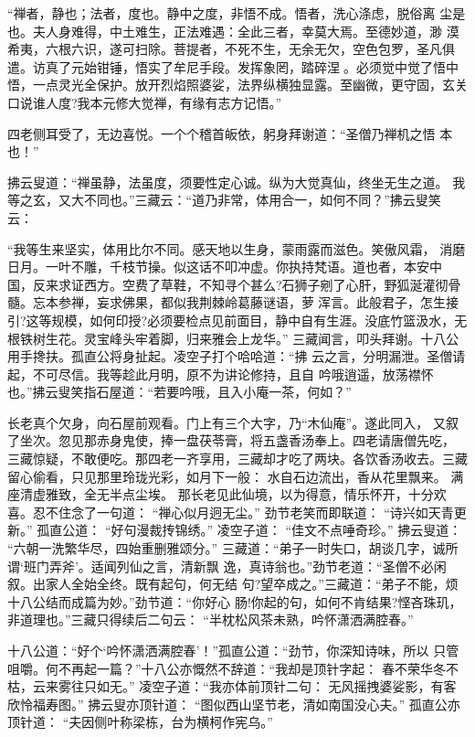 “禅者，静也；法者，度也。静中之度，非悟不成。悟者，洗心涤虑，脱俗离
尘是也。夫人身难得，中土难生，正法难遇：全此三者，幸莫大焉。至德妙道，渺
漠希夷，六根六识，遂可扫除。菩提者，不死不生，无余无欠，空色包罗，圣凡俱
遣。访真了元始钳锤，悟实了牟尼手段。发挥象罔，踏碎涅。必须觉中觉了悟中
悟，一点灵光全保护。放开烈焰照婆娑，法界纵横独显露。至幽微，更守固，玄关
口说谁人度?我本元修大觉禅，有缘有志方记悟。”

四老侧耳受了，无边喜悦。一个个稽首皈依，躬身拜谢道：“圣僧乃禅机之悟
本也！”

拂云叟道：“禅虽静，法虽度，须要性定心诚。纵为大觉真仙，终坐无生之道。
我等之玄，又大不同也。”三藏云：“道乃非常，体用合一，如何不同？”拂云叟笑
云：

“我等生来坚实，体用比尔不同。感天地以生身，蒙雨露而滋色。笑傲风霜，
消磨日月。一叶不雕，千枝节操。似这话不叩冲虚。你执持梵语。道也者，本安中
国，反来求证西方。空费了草鞋，不知寻个甚么?石狮子剜了心肝，野狐涎灌彻骨
髓。忘本参禅，妄求佛果，都似我荆棘岭葛藤谜语，萝浑言。此般君子，怎生接
引?这等规模，如何印授?必须要检点见前面目，静中自有生涯。没底竹篮汲水，无
根铁树生花。灵宝峰头牢着脚，归来雅会上龙华。”
三藏闻言，叩头拜谢。十八公用手搀扶。孤直公将身扯起。凌空子打个哈哈道：“拂
云之言，分明漏泄。圣僧请起，不可尽信。我等趁此月明，原不为讲论修持，且自
吟哦逍遥，放荡襟怀也。”拂云叟笑指石屋道：“若要吟哦，且入小庵一茶，何如？”

长老真个欠身，向石屋前观看。门上有三个大字，乃“木仙庵”。遂此同入，
又叙了坐次。忽见那赤身鬼使，捧一盘茯苓膏，将五盏香汤奉上。四老请唐僧先吃，
三藏惊疑，不敢便吃。那四老一齐享用，三藏却才吃了两块。各饮香汤收去。三藏
留心偷看，只见那里玲珑光彩，如月下一般：
水自石边流出，香从花里飘来。
满座清虚雅致，全无半点尘埃。
那长老见此仙境，以为得意，情乐怀开，十分欢喜。忍不住念了一句道：
“禅心似月迥无尘。”
劲节老笑而即联道：
“诗兴如天青更新。”
孤直公道：
“好句漫裁抟锦绣。”
凌空子道：
“佳文不点唾奇珍。”
拂云叟道：
“六朝一洗繁华尽，四始重删雅颂分。”
三藏道：“弟子一时失口，胡谈几字，诚所谓‘班门弄斧’。适闻列仙之言，清新飘
逸，真诗翁也。”劲节老道：“圣僧不必闲叙。出家人全始全终。既有起句，何无结
句?望卒成之。”三藏道：“弟子不能，烦十八公结而成篇为妙。”劲节道：“你好心
肠!你起的句，如何不肯结果?悭吝珠玑，非道理也。”三藏只得续后二句云：
“半枕松风茶未熟，吟怀潇洒满腔春。”

十八公道：“好个‘吟怀潇洒满腔春’！”孤直公道：“劲节，你深知诗味，所以
只管咀嚼。何不再起一篇？”十八公亦慨然不辞道：“我却是顶针字起：
春不荣华冬不枯，云来雾往只如无。”
凌空子道：“我亦体前顶针二句：
无风摇拽婆娑影，有客欣怜福寿图。”
拂云叟亦顶针道：
“图似西山坚节老，清如南国没心夫。”
孤直公亦顶针道：
“夫因侧叶称梁栋，台为横柯作宪乌。”

